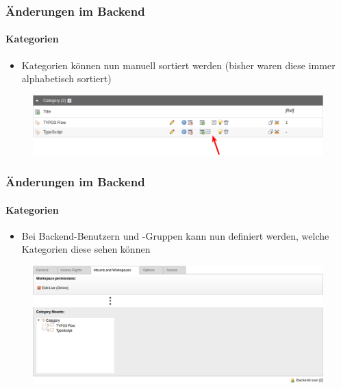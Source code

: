 
\begin{frame}[fragile]
	\frametitle{Änderungen im Backend}
	\framesubtitle{Kategorien}

 	\begin{itemize}
		\item Kategorien können nun manuell sortiert werden\newline
			\small(bisher waren diese immer alphabetisch sortiert)\normalsize
	\end{itemize}

	\begin{figure}
		\includegraphics[width=0.95\linewidth]{Images/BackendChanges/CategorySorting.png}
	\end{figure}

\end{frame}


\begin{frame}[fragile]
	\frametitle{Änderungen im Backend}
	\framesubtitle{Kategorien}

 	\begin{itemize}
		\item Bei Backend-Benutzern und -Gruppen kann nun definiert werden, welche Kategorien diese sehen können
	\end{itemize}

	\begin{figure}
		\includegraphics[width=0.95\linewidth]{Images/BackendChanges/CategoryVisibility.png}
	\end{figure}

\end{frame}

